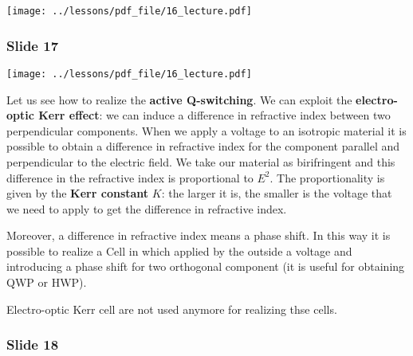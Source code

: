 \documentclass[../main/main.tex]{subfiles}
\begin{document}
\begin{minipage}[]{0.5\linewidth}
\centering
\texttt{[image: ../lessons/pdf\_file/16\_lecture.pdf]}
\end{minipage}
\hspace{0.3cm}\vspace{0.3cm}
\begin{minipage}[c]{0.47\linewidth}



\end{minipage}

\subsubsection*{Slide 17}

\begin{minipage}[]{0.5\linewidth}
\centering
\texttt{[image: ../lessons/pdf\_file/16\_lecture.pdf]}
\end{minipage}
\hspace{0.3cm}\vspace{0.3cm}
\begin{minipage}[c]{0.47\linewidth}

Let us see how to realize the \textbf{active Q-switching}. We can exploit the \textbf{electro-optic Kerr effect}: we can induce a difference in refractive index between two perpendicular components. When we apply a voltage to an isotropic material it is possible to obtain a difference in refractive index for the component parallel and perpendicular to the electric field. We take our material as birifringent and this difference in the refractive index is proportional to \( E^2 \). The proportionality is given by the \textbf{Kerr constant} \( K \): the larger it is, the smaller is the voltage that we need to apply to get the difference in refractive index.

\end{minipage}

Moreover, a difference in refractive index means a phase shift. In this way it is possible to realize a Cell in which applied by the outside a voltage and introducing a phase shift for two orthogonal component (it is useful for obtaining QWP or HWP).

Electro-optic Kerr cell are not used anymore for realizing thse cells.

\subsubsection*{Slide 18}
\end{document}
